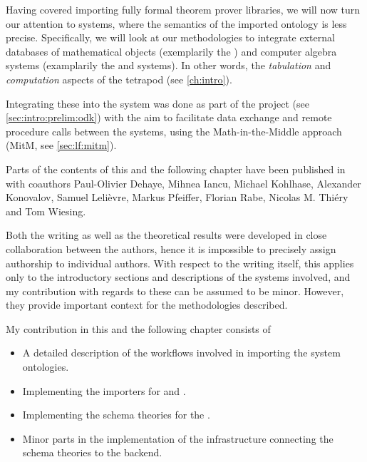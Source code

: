 Having covered importing fully formal theorem prover libraries, we will now turn our attention to systems, where the semantics of the imported ontology is less precise. Specifically, we will look at our methodologies to integrate external databases of mathematical objects (exemplarily the \LMFDB) and computer algebra systems (examplarily the \GAP and \Sage systems). In other words, the \emph{tabulation} and \emph{computation} aspects of the tetrapod (see \autoref{ch:intro}).

Integrating these into the \mmt system was done as part of the \ODK project (see \autoref{sec:intro:prelim:odk}) with the aim to facilitate data exchange and remote procedure calls between the systems, using the Math-in-the-Middle approach (MitM, see \autoref{sec:lf:mitm}). 

\begin{disclaimer*}
	Parts of the contents of this and the following chapter have been published in \cite{DehKohKon:iop16} with coauthors Paul-Olivier Dehaye, Mihnea Iancu, Michael Kohlhase, Alexander Konovalov, Samuel Leli{\`e}vre, Markus Pfeiffer, Florian Rabe, Nicolas M. Thi{\'e}ry and Tom Wiesing.
	
	Both the writing as well as the theoretical results were developed in close collaboration between the authors, hence it is impossible to precisely assign authorship to individual authors. With respect to the writing itself, this applies only to the introductory sections and descriptions of the systems involved, and my contribution with regards to these can be assumed to be minor. However, they provide important context for the methodologies described.
	
	My contribution in this and the following chapter consists of
	\begin{itemize}
		\item A detailed description of the workflows involved in importing the system ontologies.
		\item Implementing the importers for \Sage and \GAP.
		\item Implementing the schema theories for the \LMFDB.
		\item Minor parts in the implementation of the infrastructure connecting the schema theories to the \LMFDB backend.
	\end{itemize}
\end{disclaimer*}